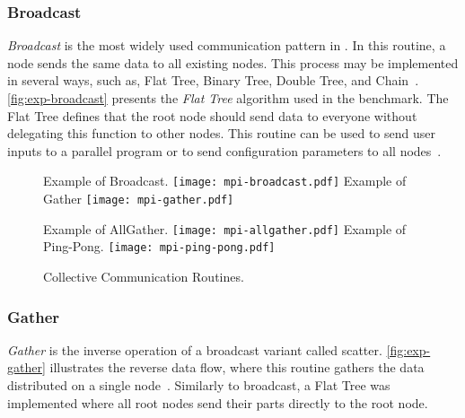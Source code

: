 			\subsubsection{Broadcast}

				\textit{Broadcast} is the most widely used communication pattern
				in \mpi. In this routine, a node sends the same data to
				all existing nodes. This process may be implemented in
				several ways, such as, Flat Tree, Binary Tree, Double Tree,
				and Chain~\cite{mpi-survey}. \autoref{fig:exp-broadcast}
				presents the \textit{Flat Tree} algorithm used in the benchmark.
				The Flat Tree defines that the root node should send data
				to everyone without delegating this function to other nodes.
				This routine can be used to send user inputs to a parallel
				program or to send configuration parameters to all
				nodes~\cite{url:mpitutorial}.

				\begin{figure}[!tb]
					\centering%
					\caption{Collective Communication Routines.}%
					\label{fig:mpi-routines}%

						{Example of \mpi Broadcast.}%
						{\texttt{[image: mpi-broadcast.pdf]}}%
					\hspace{1cm}%
						{Example of \mpi Gather}%
						{\texttt{[image: mpi-gather.pdf]}}%

					\vspace{0.5cm}%

						{Example of \mpi AllGather.}%
						{\texttt{[image: mpi-allgather.pdf]}}%
					\hspace{1cm}%
						{Example of Ping-Pong.}%
						{\texttt{[image: mpi-ping-pong.pdf]}}%

				\end{figure}

			\subsubsection{Gather}

				\textit{Gather} is the inverse operation of a broadcast variant
				called scatter. \autoref{fig:exp-gather} illustrates the reverse
				data flow, where this routine gathers the data distributed on a
				single node~\cite{url:mpitutorial}.	Similarly to broadcast, a
				Flat Tree was implemented where all root nodes send their parts
				directly to the root node.

